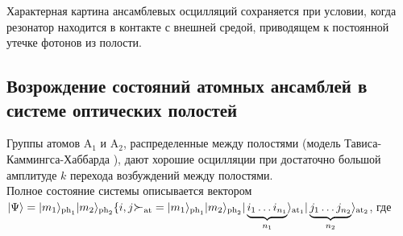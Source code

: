 \clearpage
Характерная картина ансамблевых осцилляций сохраняется при условии, когда резонатор находится в контакте с внешней средой, приводящем к постоянной утечке фотонов из полости.
\begin{figure}[h!]
	\noindent{}
\end{figure}

\subsection{Возрождение состояний атомных ансамблей в системе оптических полостей}
\vspace{-2em}
Группы атомов $\mathrm{A}_1$ и $\mathrm{A}_2$, распределенные между полостями (модель Тависа-Каммингса-Хаббарда \cite{tch_photon_blockade,tch_transfer,tch_quality}), дают хорошие осцилляции при достаточно большой амплитуде $k$ перехода возбуждений между полостями. 
\\[12pt]
\noindent Полное состояние системы описывается вектором\\
$|\Psi\ra=|m_1\ra_{\mathrm{ph}_\mathrm{1}}|m_2\ra_{\mathrm{ph}_{\mathrm{2}}}\{i, j\Succ_{\mathrm{at}} = |m_1\ra_{\mathrm{ph}_\mathrm{1}}|m_2\ra_{\mathrm{ph}_{\mathrm{2}}}|\protect\underbrace{i_1 \dots i_{n_1}}_{n_1}\ra_{\mathrm{at_1}}|\protect\underbrace{j_1 \dots j_{n_2}}_{n_2}\ra_{\mathrm{at_2}}$, где

